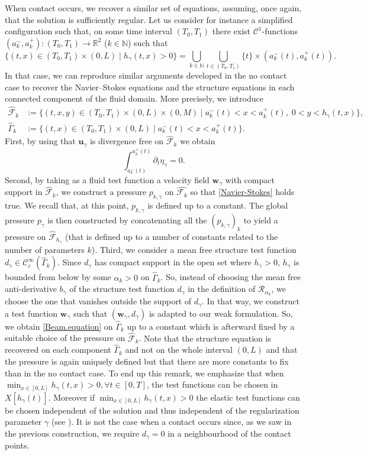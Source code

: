 \documentclass[11pt]{article}
\let\mathcal\mathscr
\let\sep\mid
\theoremstyle{remark}
\theoremstyle{definition}
\newcommand{\ug}{\boldsymbol{u}}
\newcommand{\wg}{\boldsymbol{w}}
\begin{document}
When contact occurs, we recover a similar set of equations, assuming, once again, that the solution is sufficiently regular. Let us consider for instance a simplified configuration such that, on some time interval $(T_0,T_1)$ there exist $\mathcal C^1$-functions $(a_k^{-},a_k^+): (T_0,T_1) \to \mathbb R^2$ ($k\in \mathbb N$) such that
\[
\{(t,x) \in (T_0,T_1 )\times(0,L) \sep h_\gamma(t,x) >0 \} = \bigcup_{k\in\mathbb N} \bigcup_{t\in (T_0,T_1)} \{t\} \times (a_k^{-}(t),a_{k}^+(t)).
\]
In that case, we can reproduce similar arguments developed in the no contact case to recover the Navier--Stokes equations
and the structure equations in each connected component of the fluid domain.
More precisely, we introduce
\begin{align*}
\hat{\mathcal F}_k &:= \{(t,x,y) \in (T_0,T_1) \times (0,L) \times (0,M)\mid a_k^{-}(t) < x < a_k^{+}(t), \; 0 < y < h_{\gamma}(t,x) \},
\\
\hat{\Gamma}_k &:= \{(t,x) \in (T_0,T_1) \times (0,L)\mid a_k^{-}(t) < x < a_k^{+}(t) \}.
\end{align*}
First, by using that $\ug_{\gamma}$ is divergence free on $\hat{\mathcal F}_{k}$ we obtain
\[
\int_{a_{k}^{-}(t)}^{a_k^{+}(t)} \partial_t \eta_{\gamma} = 0.
\]
Second, by taking as a fluid test function a velocity field $\wg_{\gamma}$ with compact support in $\hat{\mathcal F}_k$,
we construct a pressure $p_{k,\gamma}$ on $\hat{\mathcal F_{k}}$ so that \eqref{Navier-Stokes} holds true.
We recall that, at this point, $p_{k,\gamma}$ is defined up to a constant. The global
pressure $p_{\gamma}$ is then constructed by concatenating all the $(p_{k,\gamma})_{k}$ to yield a pressure on $\hat{\mathcal F}_{h_{\gamma}}$
(that is defined up to a number of constants related to the number of parameters $k$).
Third, we consider a mean free structure test function $d_{\gamma} \in \mathcal{C}^{\infty}_c(\hat{\Gamma}_{k})$. Since $d_{\gamma}$
has compact support in the open set where $h_{\gamma} >0 $, $h_{\gamma}$ is bounded from below by some $\alpha_k>0$ on $\hat{\Gamma}_k$. So, instead of choosing the mean free anti-derivative $b_{\gamma}$ of the structure test function $d_{\gamma}$ in the definition of $\mathcal R_{{\alpha}_k}$, we choose the one that vanishes outside the support of $d_{\gamma}$.
In that way, we construct a test function $\wg_{\gamma}$ such that $(\wg_{\gamma},d_{\gamma})$ is adapted to our weak formulation. So, we
obtain \eqref{Beam.equation} on $\hat{\Gamma}_{k}$ up to a constant which is afterward fixed by a suitable choice of the pressure
on $\hat{\mathcal F}_{k}$. {Note that the structure equation is recovered on each component $\hat{\Gamma}_{k}$ and not on the whole interval $(0, L)$} and that the pressure is again uniquely defined but that there are more constants to fix than in the no contact case.
To end up this remark, we emphasize that when $\min_{x\in [0, L]}h_\gamma(t, x)>0, \forall t\in [0, T]$, the test functions can be chosen in $X[h_\gamma(t)]$. Moreover if $\min_{x\in [0, L]}h_\gamma(t, x)>0$ the elastic test functions can be chosen independent of the solution and thus independent of the regularization parameter $\gamma$ (see \cite{Chambolle-etal}). It is not the case when a contact occurs since, as we saw in the previous construction, we require $d_\gamma=0$ in a neighbourhood of the contact points.
\end{document}
